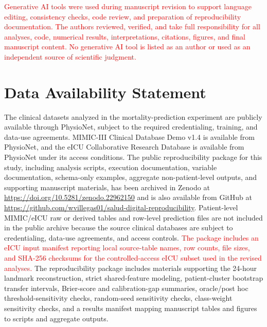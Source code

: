 \documentclass[utf8]{FrontiersinHarvard} %
\begin{document}
\textcolor{red}{Generative AI tools were used during manuscript revision to support language editing, consistency checks, code review, and preparation of reproducibility documentation. The authors reviewed, verified, and take full responsibility for all analyses, code, numerical results, interpretations, citations, figures, and final manuscript content. No generative AI tool is listed as an author or used as an independent source of scientific judgment.}

\section*{Data Availability Statement}

The clinical datasets analyzed in the mortality-prediction experiment are publicly available through PhysioNet, subject to the required credentialing, training, and data-use agreements. MIMIC-III Clinical Database Demo v1.4 is available from PhysioNet, and the eICU Collaborative Research Database is available from PhysioNet under its access conditions. The public reproducibility package for this study, including analysis scripts, execution documentation, variable documentation, schema-only examples, aggregate non-patient-level outputs, and supporting manuscript materials, has been archived in Zenodo at \textcolor{red}{\url{https://doi.org/10.5281/zenodo.22962150}} and is also available from GitHub at \url{https://github.com/wvillegas01/salud-digital-reproducibility}. Patient-level MIMIC/eICU raw or derived tables and row-level prediction files are not included in the public archive because the source clinical databases are subject to credentialing, data-use agreements, and access controls. \textcolor{red}{The package includes an eICU input manifest reporting local source-table names, row counts, file sizes, and SHA-256 checksums for the controlled-access eICU subset used in the revised analyses.} The reproducibility package includes materials supporting the 24-hour landmark reconstruction, strict shared-feature modeling, patient-cluster bootstrap transfer intervals, Brier-score and calibration-gap summaries, oracle/post hoc threshold-sensitivity checks, random-seed sensitivity checks, class-weight sensitivity checks, and a results manifest mapping manuscript tables and figures to scripts and aggregate outputs.


\end{document}
